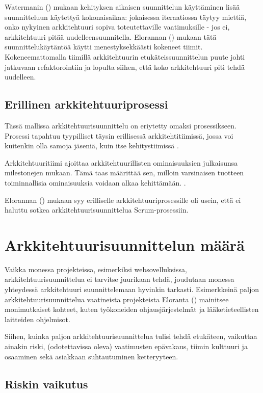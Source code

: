 Watermanin (\citeyear{waterman_how_2015}) mukaan kehityksen aikaisen suunnittelun käyttäminen lisää suunnitteluun käytettyä kokonaisaikaa: jokaisessa iteraatiossa täytyy miettiä, onko nykyinen arkkitehtuuri sopiva toteutettaville vaatimuksille - jos ei, arkkitehtuuri pitää uudelleensuunnitella. Elorannan (\citeyear{eloranta2015techniques}) mukaan tätä suunnittelukäytäntöä käytti menestyksekkäästi kokeneet tiimit. Kokeneemattomalla tiimillä arkkitehtuurin etukäteissuunnittelun puute johti jatkuvaan refaktorointiin ja lopulta siihen, että koko arkkitehtuuri piti tehdä uudelleen.

\section{Erillinen arkkitehtuuriprosessi}
Tässä mallissa arkkitehtuurisuunnittelu on eriytetty omaksi prosessikseen. Prosessi tapahtuu tyypilliset täysin erillisessä arkkitehtitiimissä, jossa voi kuitenkin olla samoja jäseniä, kuin itse kehitystiimissä \citep{eloranta2015techniques}.

Arkkitehtuuritiimi ajoittaa arkkitehtuurillisten ominaisuuksien julkaisunsa milestonejen mukaan. Tämä taas määrittää sen, milloin varsinaisen tuotteen toiminnallisia ominaisuuksia voidaan alkaa kehittämään. \citep{eloranta2015techniques}.

Elorannan (\citeyear{eloranta2015techniques}) mukaan syy erilliselle arkkitehtuuriprosessille oli usein, että ei haluttu sotkea arkkitehtuurisuunnittelua Scrum-prosessiin.

\chapter{Arkkitehtuurisuunnittelun määrä}

Vaikka monessa projekteissa, esimerkiksi websovelluksissa, arkkitehtuurisuunnittelua ei tarvitse juurikaan tehdä, joudutaan monessa yhteydessä arkkitehtuuri suunnittelemaan hyvinkin tarkasti. Esimerkkeinä paljon arkkitehtuurisuunnittelua vaatineista projekteista Eloranta (\citeyear{eloranta2015techniques}) mainitsee monimutkaiset kohteet, kuten työkoneiden ohjausjärjestelmät ja lääketieteellisten laitteiden ohjelmisot.

Siihen, kuinka paljon arkkitehtuurisuunnittelua tulisi tehdä etukäteen, vaikuttaa ainakin riski, (odotettavissa oleva) vaatimusten epävakaus, tiimin kulttuuri ja osaaminen sekä asiakkaan suhtautuminen ketteryyteen.

\section{Riskin vaikutus}

